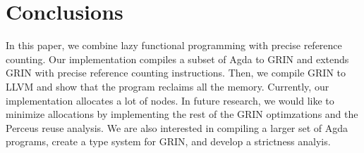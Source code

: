 \documentclass[9pt, twocolumn]{article}
\begin{document}


\section{Conclusions}
In this paper, we combine lazy functional programming with precise reference counting.
Our implementation compiles a subset of Agda to GRIN and extends GRIN with precise reference counting instructions. 
Then, we compile GRIN to LLVM and show that the program reclaims all the memory.
Currently, our implementation allocates a lot of nodes. 
In future research, we would like to minimize allocations by implementing the rest of the GRIN optimzations and the Perceus reuse analysis.
We are also interested in compiling a larger set of Agda programs, create a type system for GRIN, and develop a strictness analyis.
\end{document}

